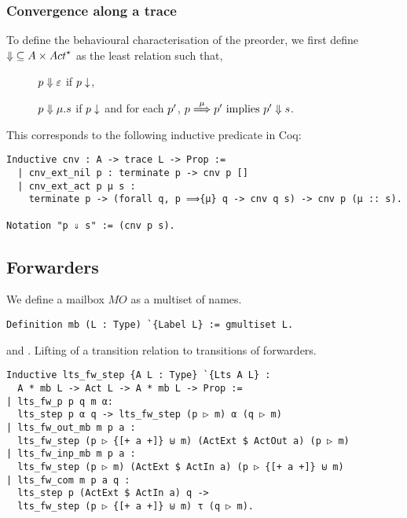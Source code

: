 \subsubsection{Convergence along a trace}

To define the behavioural characterisation of the preorder, we first define
${\cnvalong} \subseteq \States \times \Actfin$ as the least relation such
that,%
\begin{description}
\item[\cnvepsilon] $p \mathrel{\Downarrow} \varepsilon$ if $p \downarrow$,
\item[\cnvmu] $ p \mathrel{\Downarrow} \mu.s $ if $p \downarrow$ and for each $p'$,
$p \mathrel{\overset{\mu} \Longrightarrow} p' \text{ implies } p' \mathrel{\Downarrow} s$.
\end{description}

\noindent
This corresponds to the following inductive predicate in Coq:

\begin{mdframed}
\begin{verbatim}
Inductive cnv : A -> trace L -> Prop :=
  | cnv_ext_nil p : terminate p -> cnv p []
  | cnv_ext_act p μ s :
    terminate p -> (forall q, p ⟹{μ} q -> cnv q s) -> cnv p (μ :: s).

Notation "p ⇓ s" := (cnv p s).
\end{verbatim}
\end{mdframed}


\subsection{Forwarders}

We define a mailbox $MO$ as a multiset of names.

\begin{mdframed}
\begin{verbatim}
Definition mb (L : Type) `{Label L} := gmultiset L.
\end{verbatim}
\end{mdframed}

 and .
Lifting of a transition relation to transitions of forwarders.

\begin{mdframed}
\begin{verbatim}
Inductive lts_fw_step {A L : Type} `{Lts A L} :
  A * mb L -> Act L -> A * mb L -> Prop :=
| lts_fw_p p q m α:
  lts_step p α q -> lts_fw_step (p ▷ m) α (q ▷ m)
| lts_fw_out_mb m p a :
  lts_fw_step (p ▷ {[+ a +]} ⊎ m) (ActExt $ ActOut a) (p ▷ m)
| lts_fw_inp_mb m p a :
  lts_fw_step (p ▷ m) (ActExt $ ActIn a) (p ▷ {[+ a +]} ⊎ m)
| lts_fw_com m p a q :
  lts_step p (ActExt $ ActIn a) q ->
  lts_fw_step (p ▷ {[+ a +]} ⊎ m) τ (q ▷ m).
\end{verbatim}
\end{mdframed}


